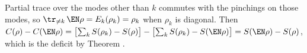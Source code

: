 Partial trace over the modes other than $k$ commutes with the pinchings on those modes, so $\tr_{\neq k}\,\EN\rho = E_k(\rho_k) = \rho_k$ when $\rho_k$ is diagonal. Then $C(\rho) - C(\EN\rho) = \bigl[\sum_k S(\rho_k) - S(\rho)\bigr] - \bigl[\sum_k S(\rho_k) - S(\EN\rho)\bigr] = S(\EN\rho) - S(\rho)$, which is the deficit by Theorem .
